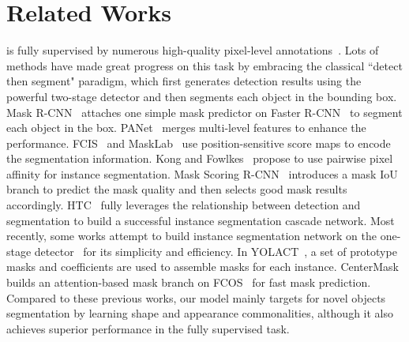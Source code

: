 \documentclass[runningheads]{llncs}
\begin{document}
\vspace{-4mm}


\section{Related Works}
\vspace{-2mm}


 is fully supervised by numerous high-quality pixel-level annotations~\cite{dai2015convolutional,dai2016instance,girshick2014rich,hariharan2014simultaneous,hariharan2015hypercolumns,hayder2017boundary,pinheiro2015learning,pinheiro2016learning}.
Lots of methods have made great progress on this task by embracing the classical ``detect then segment" paradigm, which first generates detection results using the powerful two-stage detector and then segments each object in the bounding box. 
Mask R-CNN~\cite{he2017mask} attaches one simple mask predictor on Faster R-CNN~\cite{ren2015faster} to segment each object in the box.
PANet~\cite{liu2018path} merges multi-level features to enhance the performance. 
FCIS~\cite{li2017fully} and MaskLab~\cite{chen2018masklab} use position-sensitive score maps to encode the segmentation information. Kong and Fowlkes~\cite{Kong_2018_CVPR} propose to use pairwise pixel affinity for instance segmentation.
Mask Scoring R-CNN~\cite{huang2019mask} introduces a mask IoU branch to predict the mask quality and then selects good mask results accordingly. HTC~\cite{chen2019hybrid} fully leverages the relationship between detection and segmentation to build a successful instance segmentation cascade network. Most recently, some works attempt to build instance segmentation network on the one-stage detector~\cite{lin2017focal,tian2019fcos} for its simplicity and efficiency. 
In YOLACT~\cite{bolya2019yolact}, a set of prototype masks and coefficients are used to assemble masks for each instance. CenterMask~\cite{lee2019centermask} builds an attention-based mask branch on FCOS~\cite{tian2019fcos} for fast mask prediction. Compared to these previous works, our model mainly targets for novel objects segmentation by learning shape and appearance commonalities, although it also achieves superior performance in the fully supervised task.
\end{document}

